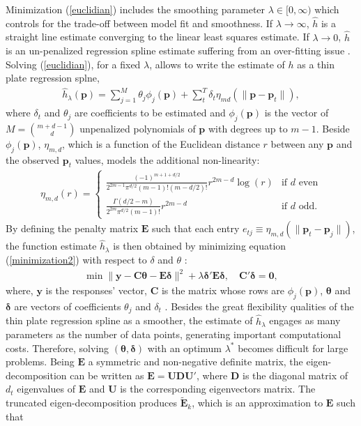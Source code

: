 \documentclass{article}\usepackage[]{graphicx}\usepackage[]{color}
\begin{document}
Minimization (\ref{euclidian}) includes the smoothing parameter $\lambda \in [0,\infty )$ which controls for the trade-off between model fit and smoothness. If $\lambda \rightarrow \infty$, $\hat{h}$ is a straight line estimate converging to the linear least squares estimate. If $\lambda \rightarrow 0$, $\hat{h}$ is an un-penalized regression spline estimate  suffering from an over-fitting issue \cite{de1978practical}. Solving (\ref{euclidian}), for a fixed $\lambda $, allows to write the estimate of $h$ as a thin plate regression splne, 
\begin{align}
\hat{h}_{\lambda }(\mathbf{p}) = \sum _{j=1}^ M \theta_j \phi_j(\mathbf{p})+ \sum_t^T \delta_t \eta_{md}(\| \mathbf{p}-\mathbf{p}_t \| ) ,
\end{align}
where $\delta_t$ and $\theta_j$ are coefficients to be estimated and $\phi_j(\mathbf{p})$ is the vector of $M={m+d-1\choose d}$ unpenalized polynomials of $\mathbf{p}$ with degrees up to $m-1$. Beside $\phi_j(\mathbf{p})$, $\eta_{m,d}$, which is a function of the Euclidean distance $r$ between any $\mathbf{p}$ and the observed $\mathbf{p}_t$ values, models the additional non-linearity:
\begin{align} 
\eta _{m,d}(r) = \begin{cases} \frac{(-1)^{m+1+d/2}}{2^{2m-1}\pi ^{d/2}(m-1)!(m-d/2)!}r^{2m-d}\log (r) & \text {if } d \text { even}\\ \frac{\Gamma (d/2-m)}{2^{2m}\pi ^{d/2}(m-1)!}r^{2m-d} & \text {if } d \text { odd.} \end{cases}
\end{align}
By defining the penalty matrix $\mathbf{E}$ such that each entry $e_{tj}\equiv \eta _{m,d}(\| \mathbf{p}_t -\mathbf{p}_ j\| )$, the function estimate $\hat{h}_{\lambda }$ is then obtained by minimizing equation (\ref{minimization2}) with respect to $ \delta$ and $\theta$ :
\begin{align} \label{minimization2}
\min \| \mathbf{\mathbf{y}-C \theta -E \delta} \| ^2+\lambda \mathbf {\delta' E \delta}, \quad \mathbf {C' \delta } =\mathbf{0},
\end{align}
where, $\mathbf{y}$ is the responses' vector, $\mathbf{C}$ is the matrix whose rows are $\phi_j(\mathbf{p})$, $\mathbf{\theta}$ and $\mathbf{\delta}$ are vectors of coefficients $\theta_j$ and $\delta_t$ \cite{wood2006generalized}. Besides the great flexibility qualities of the thin plate regression spline as a smoother, the estimate of $\hat{h}_{\lambda}$ engages as many parameters as the number of data points, generating important computational costs. Therefore, solving $(\mathbf{\theta ,\delta} )$ with an optimum $\lambda^*$ becomes difficult for large problems. Being $\mathbf{E} $ a symmetric and non-negative definite matrix, the eigen-decomposition can be written as $\mathbf{E = U D U'}$, where $\mathbf{D} $ is the diagonal matrix of $d_{t}$ eigenvalues of $\mathbf{E} $ and $\mathbf{U}$ is the corresponding eigenvectors matrix. The truncated eigen-decomposition produces $\tilde{\mathbf{E}}_ k$, which is an approximation to $\mathbf{E} $ such that
\end{document}
